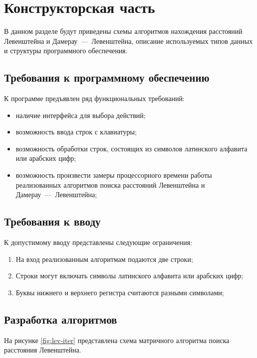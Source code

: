 \chapter{Конструкторская часть}
В данном разделе будут приведены схемы алгоритмов нахождения расстояний Левенштейна и Дамерау~---~Левенштейна, описание используемых типов данных и структуры программного обеспечения.

\section{Требования к программному обеспечению}

К программе предъявлен ряд функциональных требований:

\begin{itemize}
    \item наличие интерфейса для выбора действий;
    \item возможность ввода строк с клавиатуры;
    \item возможность обработки строк, состоящих из символов латинского алфавита или арабских цифр;
    \item возможность произвести замеры процессорного времени работы реализованных алгоритмов поиска расстояний Левенштейна и Дамерау~---~Левенштейна;
\end{itemize}

\section{Требования к вводу}

К допустимому вводу представлены следующие ограничения:

\begin{enumerate}
    \item На вход реализованным алгоритмам подаются две строки;
    \item Строки могут включать символы латинского алфавита или арабских цифр;
    \item Буквы нижнего и верхнего регистра считаются разными символами;
\end{enumerate}

\section{Разработка алгоритмов}


На рисунке \ref{fig:lev-iter} представлена схема матричного алгоритма поиска расстояния Левенштейна.


